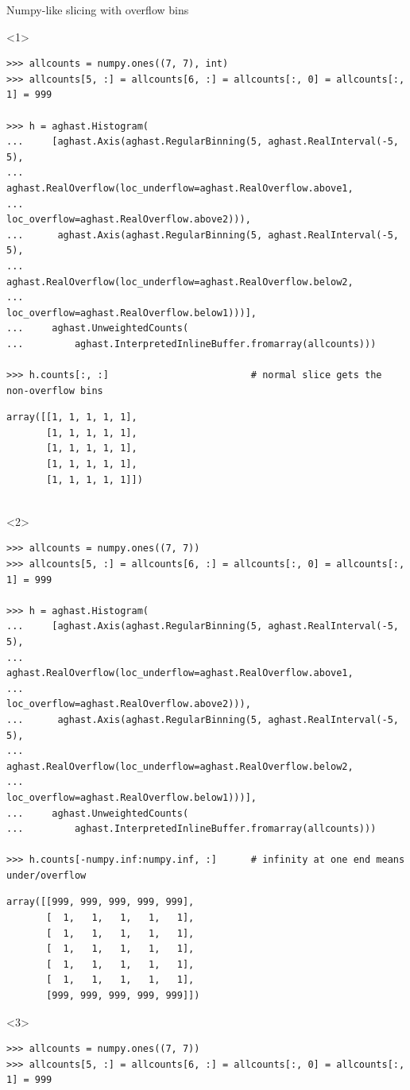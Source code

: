 \documentclass[aspectratio=169]{beamer}
\begin{document}
\begin{frame}[fragile]{Numpy-like slicing with overflow bins}
\scriptsize
\vspace{0.4 cm}
\begin{onlyenv}<1>
\begin{verbatim}
>>> allcounts = numpy.ones((7, 7), int)
>>> allcounts[5, :] = allcounts[6, :] = allcounts[:, 0] = allcounts[:, 1] = 999

>>> h = aghast.Histogram(
...     [aghast.Axis(aghast.RegularBinning(5, aghast.RealInterval(-5, 5),
...                  aghast.RealOverflow(loc_underflow=aghast.RealOverflow.above1,
...                                      loc_overflow=aghast.RealOverflow.above2))),
...      aghast.Axis(aghast.RegularBinning(5, aghast.RealInterval(-5, 5),
...                  aghast.RealOverflow(loc_underflow=aghast.RealOverflow.below2,
...                                      loc_overflow=aghast.RealOverflow.below1)))],
...     aghast.UnweightedCounts(
...         aghast.InterpretedInlineBuffer.fromarray(allcounts)))

>>> h.counts[:, :]                         # normal slice gets the non-overflow bins
\end{verbatim}
\begin{verbatim}
array([[1, 1, 1, 1, 1],
       [1, 1, 1, 1, 1],
       [1, 1, 1, 1, 1],
       [1, 1, 1, 1, 1],
       [1, 1, 1, 1, 1]])


\end{verbatim}
\end{onlyenv}
\begin{onlyenv}<2>
\begin{verbatim}
>>> allcounts = numpy.ones((7, 7))
>>> allcounts[5, :] = allcounts[6, :] = allcounts[:, 0] = allcounts[:, 1] = 999

>>> h = aghast.Histogram(
...     [aghast.Axis(aghast.RegularBinning(5, aghast.RealInterval(-5, 5),
...                  aghast.RealOverflow(loc_underflow=aghast.RealOverflow.above1,
...                                      loc_overflow=aghast.RealOverflow.above2))),
...      aghast.Axis(aghast.RegularBinning(5, aghast.RealInterval(-5, 5),
...                  aghast.RealOverflow(loc_underflow=aghast.RealOverflow.below2,
...                                      loc_overflow=aghast.RealOverflow.below1)))],
...     aghast.UnweightedCounts(
...         aghast.InterpretedInlineBuffer.fromarray(allcounts)))

>>> h.counts[-numpy.inf:numpy.inf, :]      # infinity at one end means under/overflow
\end{verbatim}
\begin{verbatim}
array([[999, 999, 999, 999, 999], 
       [  1,   1,   1,   1,   1], 
       [  1,   1,   1,   1,   1], 
       [  1,   1,   1,   1,   1], 
       [  1,   1,   1,   1,   1], 
       [  1,   1,   1,   1,   1], 
       [999, 999, 999, 999, 999]])
\end{verbatim}
\end{onlyenv}
\begin{onlyenv}<3>
\begin{verbatim}
>>> allcounts = numpy.ones((7, 7))
>>> allcounts[5, :] = allcounts[6, :] = allcounts[:, 0] = allcounts[:, 1] = 999


\end{verbatim}
\end{onlyenv}
\end{frame}
\end{document}
